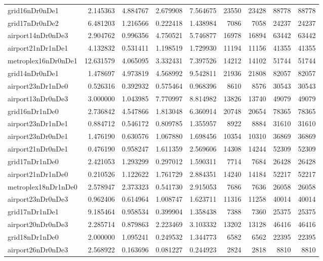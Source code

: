 \begin{longtable}{|l|r|r|r|r|r|r|r|r|}
grid16nDr0nDe1 & 2.145363 & 4.884767 & 2.679908 & 7.564675 & 23550 & 23428 & 88778 & 88778 \\
grid17nDr0nDe2 & 6.481203 & 1.216566 & 0.222418 & 1.438984 & 7086 & 7058 & 24237 & 24237 \\
airport14nDr0nDe3 & 2.904762 & 0.996356 & 4.750521 & 5.746877 & 16978 & 16894 & 63442 & 63442 \\
airport21nDr1nDe1 & 4.132832 & 0.531411 & 1.198519 & 1.729930 & 11194 & 11156 & 41355 & 41355 \\
metroplex16nDr0nDe1 & 12.631579 & 4.065095 & 3.332431 & 7.397526 & 14212 & 14102 & 51744 & 51744 \\
grid14nDr0nDe1 & 1.478697 & 4.973819 & 4.568992 & 9.542811 & 21936 & 21808 & 82057 & 82057 \\
airport23nDr1nDe0 & 0.526316 & 0.392932 & 0.575464 & 0.968396 & 8610 & 8576 & 30543 & 30543 \\
airport13nDr0nDe3 & 3.000000 & 1.043985 & 7.770997 & 8.814982 & 13826 & 13740 & 49079 & 49079 \\
grid16nDr1nDe0 & 2.736842 & 4.547866 & 1.813048 & 6.360914 & 20748 & 20654 & 78365 & 78365 \\
airport23nDr1nDe1 & 0.884712 & 0.546172 & 0.809785 & 1.355957 & 8922 & 8884 & 31610 & 31610 \\
airport23nDr0nDe1 & 1.476190 & 0.630576 & 1.067880 & 1.698456 & 10354 & 10310 & 36869 & 36869 \\
airport21nDr0nDe1 & 0.476190 & 0.958247 & 1.611359 & 2.569606 & 14308 & 14244 & 52309 & 52309 \\
grid17nDr1nDe0 & 2.421053 & 1.293299 & 0.297012 & 1.590311 & 7714 & 7684 & 26428 & 26428 \\
airport21nDr1nDe0 & 0.210526 & 1.122622 & 1.761729 & 2.884351 & 14240 & 14184 & 52217 & 52217 \\
metroplex18nDr1nDe0 & 2.578947 & 2.373323 & 0.541730 & 2.915053 & 7686 & 7636 & 26058 & 26058 \\
airport23nDr0nDe3 & 0.962406 & 0.614964 & 1.008747 & 1.623711 & 11316 & 11258 & 40014 & 40014 \\
grid17nDr1nDe1 & 9.185464 & 0.958534 & 0.399904 & 1.358438 & 7388 & 7360 & 25375 & 25375 \\
airport20nDr0nDe3 & 2.285714 & 0.879863 & 2.223469 & 3.103332 & 13202 & 13128 & 46416 & 46416 \\
grid18nDr1nDe0 & 2.000000 & 1.095241 & 0.249532 & 1.344773 & 6582 & 6562 & 22395 & 22395 \\
airport26nDr0nDe3 & 2.568922 & 0.163696 & 0.081227 & 0.244923 & 2824 & 2818 & 8810 & 8810 \\

\end{longtable}

